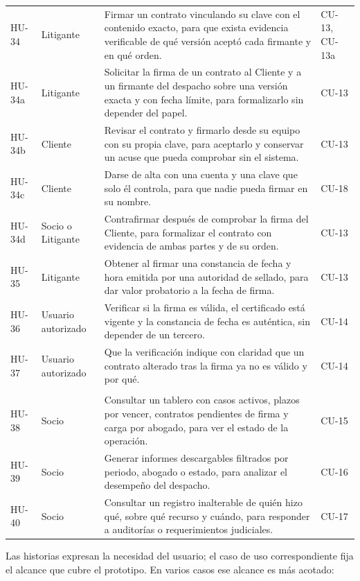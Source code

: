 {\begin{longtable}{@{}p{1.6cm}L{2.35cm}L{10.25cm}>{\raggedright\arraybackslash}p{1.5cm}@{}}
  HU-34 & Litigante & Firmar un contrato vinculando su clave con el contenido exacto, para que exista evidencia verificable de qué versión aceptó cada firmante y en qué orden. & CU-13, CU-13a \\
  HU-34a & Litigante & Solicitar la firma de un contrato al Cliente y a un firmante del despacho sobre una versión exacta y con fecha límite, para formalizarlo sin depender del papel. & CU-13 \\
  HU-34b & Cliente & Revisar el contrato y firmarlo desde su equipo con su propia clave, para aceptarlo y conservar un acuse que pueda comprobar sin el sistema. & CU-13 \\
  HU-34c & Cliente & Darse de alta con una cuenta y una clave que solo él controla, para que nadie pueda firmar en su nombre. & CU-18 \\
  HU-34d & Socio o Litigante & Contrafirmar después de comprobar la firma del Cliente, para formalizar el contrato con evidencia de ambas partes y de su orden. & CU-13 \\
  HU-35 & Litigante & Obtener al firmar una constancia de fecha y hora emitida por una autoridad de sellado, para dar valor probatorio a la fecha de firma. & CU-13 \\
  HU-36 & Usuario autorizado & Verificar si la firma es válida, el certificado está vigente y la constancia de fecha es auténtica, sin depender de un tercero. & CU-14 \\
  HU-37 & Usuario autorizado & Que la verificación indique con claridad que un contrato alterado tras la firma ya no es válido y por qué. & CU-14 \\
  \addlinespace
  \\
  HU-38 & Socio & Consultar un tablero con casos activos, plazos por vencer, contratos pendientes de firma y carga por abogado, para ver el estado de la operación. & CU-15 \\
  HU-39 & Socio & Generar informes descargables filtrados por periodo, abogado o estado, para analizar el desempeño del despacho. & CU-16 \\
  HU-40 & Socio & Consultar un registro inalterable de quién hizo qué, sobre qué recurso y cuándo, para responder a auditorías o requerimientos judiciales. & CU-17 \\
\end{longtable}
}

Las historias expresan la necesidad del usuario; el caso de uso correspondiente fija el alcance que cubre el prototipo. En varios casos ese alcance es más acotado:

